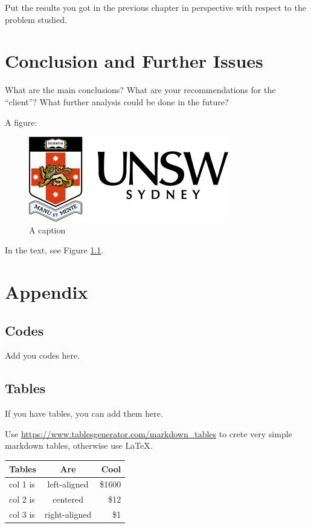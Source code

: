 \documentclass[mstat,12pt]{unswthesis}
\begin{document}
Put the results you got in the previous chapter in perspective with
respect to the problem studied.

\hypertarget{conclusion-and-further-issues}{%
\chapter{Conclusion and Further
Issues}\label{conclusion-and-further-issues}}

What are the main conclusions? What are your recommendations for the
``client''? What further analysis could be done in the future?

A figure:

\begin{figure}[H]
\includegraphics{unsw-logo.png}
\caption{A caption}\label{myfigure}
\end{figure}

In the text, see Figure \ref{myfigure}.




\hypertarget{appendix}{%
\chapter*{Appendix}\label{appendix}}

\hypertarget{codes}{%
\section*{\texorpdfstring{\textbf{Codes}}{Codes}}\label{codes}}

Add you codes here.

\hypertarget{tables}{%
\section*{\texorpdfstring{\textbf{Tables}}{Tables}}\label{tables}}

If you have tables, you can add them here.

Use \url{https://www.tablesgenerator.com/markdown_tables} to crete very
simple markdown tables, otherwise use \LaTeX.

\begin{longtable}[]{@{}lcr@{}}
\toprule
Tables & Are & Cool\tabularnewline
\midrule
\endhead
col 1 is & left-aligned & \$1600\tabularnewline
col 2 is & centered & \$12\tabularnewline
col 3 is & right-aligned & \$1\tabularnewline
\bottomrule
\end{longtable}
\end{document}
